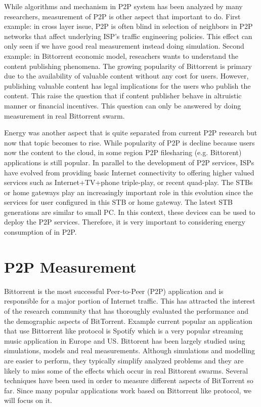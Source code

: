 While algorithms and mechanism in P2P system has been analyzed by many researchers, measurement of P2P is other aspect that important to do. 
First example: in cross layer issue, P2P is often blind in selection of neighbors in P2P networks that affect underlying ISP's traffic engineering policies.  
This effect can only seen if we have good real measurement instead doing simulation.
Second example: in Bittorrent economic model, reseachers wants to understand the content publishing phenomena. 
The growing popularity of Bittorrent is primary due to the availability of valuable content without any cost for users.
However, publishing valuable content has legal implications for the users who publish the content.
This raise the question that if content publisher behave in altruistic manner or financial incentives. 
This question can only be answered by doing measurement in real Bittorrent swarm. 

Energy was another aspect that is quite separated from current P2P research but now that topic becomes to rise. 
While popularity of P2P is decline because users now the content to the cloud, in some region P2P filesharing (e.g. Bittorent) applications is still popular.
In parallel to the development of P2P services, ISPs have evolved from providing basic Internet connectivity to offering higher valued services such as Internet+TV+phone triple-play, or recent quad-play. 
The STBs or home gateways play an increasingly important role in this evolution since the services for user configured in this STB or home gateway.
The latest STB generations are similar to small PC. 
In this context, these devices can be used to deploy the  P2P services. 
Therefore, it is very important to considering energy consumption of in P2P.





\section{P2P Measurement}

Bittorrent is the most successful Peer-to-Peer (P2P) application and is responsible for a major portion of Internet traffic. 
This has attracted the interest of the research community that has thoroughly evaluated the performance and the demographic aspects of BitTorrent. 
Example current popular an application that use Bittorrent like protocol is Spotify which is a very popular streaming music application in Europe and US.
Bittorent has been largely studied using simulations, models and real measurements. 
Although simulations and modelling are easier to perform, they typically simplify analyzed problems and they are likely to miss some of the effects which occur in real Bittorent swarms. 
Several techniques have been used in order to measure different aspects of BitTorrent so far. 
Since many popular applications work based on Bittorrent like protocol, we will focus on it.

